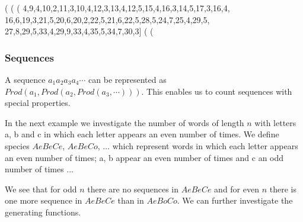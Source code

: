 \documentclass[10pt]{article}
\begin{document}
\begin{example}
(%
(%
(%
        4,9,4,10,2,11,3,10,4,12,3,13,4,12,5,15,4,16,3,14,5,17,3,16,4,
        16,6,19,3,21,5,20,6,20,2,22,5,21,6,22,5,28,5,24,7,25,4,29,5,
        27,8,29,5,33,4,29,9,33,4,35,5,34,7,30,3]
(%
(%
\end{example}

\subsubsection{Sequences}

A sequence $a_1a_2a_3a_4\cdots$ can be represented as $Prod(a_1,
Prod(a_2, Prod(a_3, \cdots )))$. This enables us to count sequences
with special properties.

In the next example we investigate the number of words of length $n$
with letters a, b and c in which each letter appears an even number of
times. We define species $AeBeCe$, $AeBeCo$, $\ldots$ which represent
words in which each letter appears an even number of times; a, b
appear an even number of times and c an odd number of times $\ldots$

%
We see that for odd $n$ there are no sequences in $AeBeCe$ and for
even $n$ there is one more sequence in $AeBeCe$ than in $AeBoCo$. We
can further investigate the generating functions.
\end{document}
